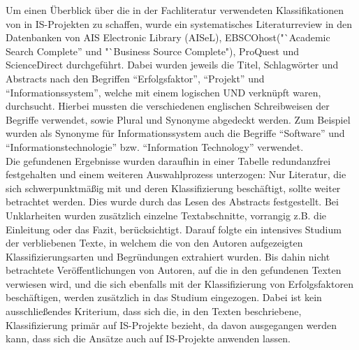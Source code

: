 Um einen Überblick über die in der Fachliteratur verwendeten Klassifikationen von \EF in IS-Projekten zu schaffen, wurde ein 
systematisches Literaturreview in den Datenbanken von AIS Electronic Library (AISeL), 
EBSCOhost("`Academic Search Complete” und "`Business Source Complete"), ProQuest und ScienceDirect durchgeführt.
Dabei wurden jeweils die Titel, Schlagwörter und Abstracts nach den Begriffen 
"`Erfolgsfaktor"', "`Projekt"' und "`Informationssystem"', welche mit einem logischen UND verknüpft waren, durchsucht. 
Hierbei mussten die verschiedenen englischen Schreibweisen der Begriffe verwendet, sowie Plural und Synonyme abgedeckt werden.
Zum Beispiel wurden als Synonyme für Informationssystem auch die Begriffe "`Software"' und "`Informationstechnologie"' bzw. "`Information Technology"' verwendet.\\
Die gefundenen Ergebnisse wurden daraufhin in einer Tabelle redundanzfrei festgehalten und einem weiteren Auswahlprozess unterzogen:
Nur Literatur, die sich schwerpunktmäßig mit \EF und deren Klassifizierung beschäftigt, sollte weiter betrachtet werden.
Dies wurde durch das Lesen des Abstracts festgestellt. Bei Unklarheiten wurden zusätzlich einzelne Textabschnitte,
vorrangig z.B. die Einleitung oder das Fazit, berücksichtigt.
Darauf folgte ein intensives Studium der verbliebenen Texte, in welchem die von den Autoren aufgezeigten Klassifizierungsarten und Begründungen extrahiert wurden.
Bis dahin nicht betrachtete Veröffentlichungen von Autoren, auf die in den gefundenen Texten verwiesen wird, und die sich ebenfalls mit der Klassifizierung von Erfolgsfaktoren
beschäftigen, werden zusätzlich in das Studium eingezogen. Dabei ist kein ausschließendes Kriterium, dass sich die, in den Texten beschriebene, Klassifizierung
primär auf IS-Projekte bezieht, da davon ausgegangen werden kann, dass sich die Ansätze auch auf IS-Projekte anwenden lassen.
